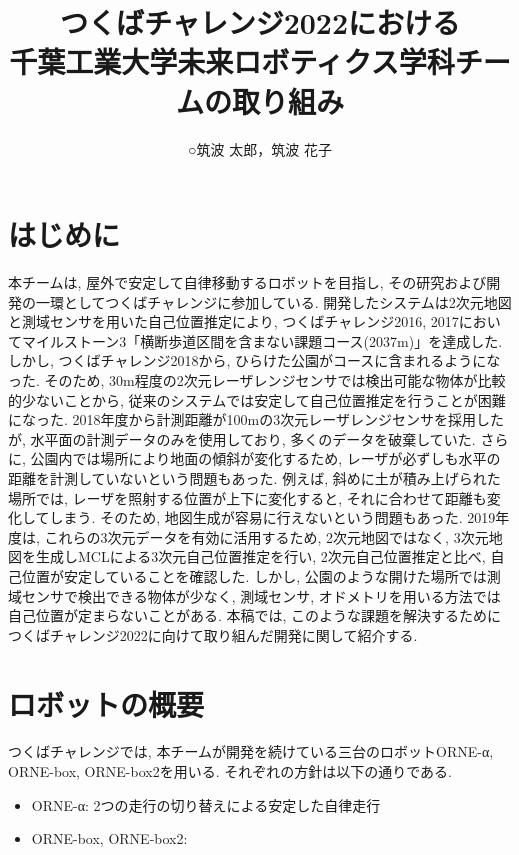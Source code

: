 \documentclass[uplatex, twocolumn, 9pt]{jsproceedings}
\title{つくばチャレンジ2022における\\千葉工業大学未来ロボティクス学科チームの取り組み}
\author{○筑波 太郎\authorrefmark{1}，筑波 花子\authorrefmark{1}}
\affiliation{千葉工業大学未来ロボティクス学科チームα, box, box2}
\begin{document}
\maketitle


\section{はじめに}
本チームは, 屋外で安定して自律移動するロボットを目指し, その研究および開発の一環としてつくばチャレンジに参加している. 開発したシステムは2次元地図と測域センサを用いた自己位置推定により, つくばチャレンジ2016, 2017においてマイルストーン3「横断歩道区間を含まない課題コース(2037m)」を達成した. しかし, つくばチャレンジ2018から, ひらけた公園がコースに含まれるようになった. そのため, 30m程度の2次元レーザレンジセンサでは検出可能な物体が比較的少ないことから, 従来のシステムでは安定して自己位置推定を行うことが困難になった. 2018年度から計測距離が100mの3次元レーザレンジセンサを採用したが, 水平面の計測データのみを使用しており, 多くのデータを破棄していた. さらに, 公園内では場所により地面の傾斜が変化するため, レーザが必ずしも水平の距離を計測していないという問題もあった. 例えば, 斜めに土が積み上げられた場所では, レーザを照射する位置が上下に変化すると, それに合わせて距離も変化してしまう. そのため, 地図生成が容易に行えないという問題もあった. 2019年度は, これらの3次元データを有効に活用するため, 2次元地図ではなく, 3次元地図を生成しMCLによる3次元自己位置推定を行い, 2次元自己位置推定と比べ, 自己位置が安定していることを確認した. しかし, 公園のような開けた場所では測域センサで検出できる物体が少なく, 測域センサ, オドメトリを用いる方法では自己位置が定まらないことがある. 本稿では, このような課題を解決するためにつくばチャレンジ2022に向けて取り組んだ開発に関して紹介する. 

\section{ロボットの概要}
つくばチャレンジでは, 本チームが開発を続けている三台のロボットORNE-α, ORNE-box, ORNE-box2を用いる. それぞれの方針は以下の通りである. 
\begin{itemize}
  \item ORNE-α: 2つの走行の切り替えによる安定した自律走行
  \item ORNE-box, ORNE-box2: 
\end{itemize}
\end{document}
